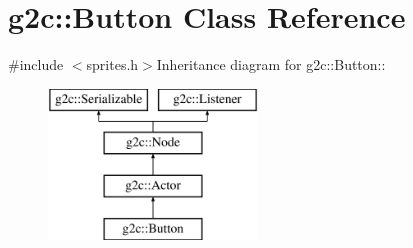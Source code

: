 \hypertarget{classg2c_1_1_button}{
\section{g2c::Button Class Reference}
\label{classg2c_1_1_button}
}


{\ttfamily \#include $<$sprites.h$>$}Inheritance diagram for g2c::Button::\begin{figure}[H]
\begin{center}
\leavevmode
\includegraphics[height=4cm]{classg2c_1_1_button}
\end{center}
\end{figure}
